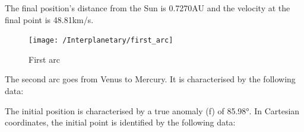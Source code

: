 \documentclass[11pt,a4paper]{report}
\begin{document}
\begin{table}[H]
\centering
{}
\end{table}

The final position’s distance from the Sun is 0.7270AU and the velocity at the final point is 48.81km/s.

\begin{figure}[H]
\centering
\texttt{[image: /Interplanetary/first\_arc]}
\caption{First arc}
\end{figure}

The second arc goes from Venus to Mercury. It is characterised by the following data:

\begin{table}[H]
\centering
{}
\end{table}

The initial position is characterised by a true anomaly (f) of 85.98°. In Cartesian coordinates, the initial point is identified by the following data:

\begin{table}[H]
\centering
{}
\end{table}
\end{document}
